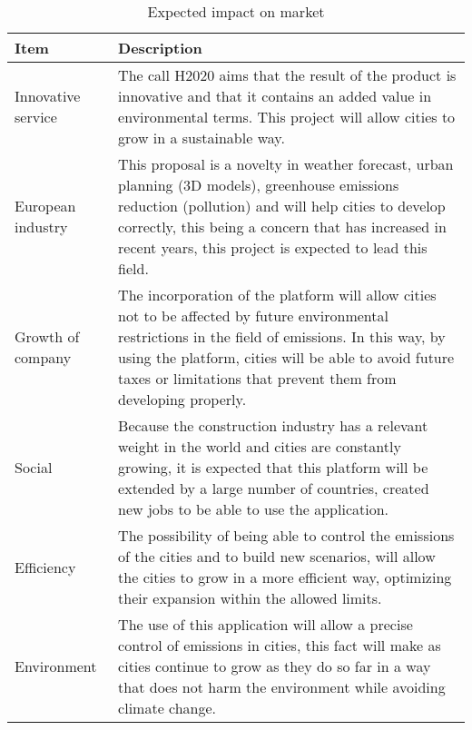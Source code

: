 \begin{table}[H]
	\centering
	\begin{tabular}{l p{11cm}}
		
		\toprule[2pt]
		
		\textbf{Item} &  \textbf{Description}\\
		
		\midrule [1.5pt]
		
		Innovative service & The call H2020 aims that the result of the product is innovative and that it contains an added value in environmental terms. This project will allow cities to grow in a sustainable way.\vspace{0.2cm}\\
		
		\midrule
		
		European industry & This proposal is a novelty in weather forecast, urban planning (3D models), greenhouse emissions reduction (pollution) and will help cities to develop correctly, this being a concern that has increased in recent years, this project is expected to lead this field.\vspace{0.2cm}\\
		
		\midrule
		
		Growth of company & The incorporation of the platform will allow cities not to be affected by future environmental restrictions in the field of emissions. In this way, by using the platform, cities will be able to avoid future taxes or limitations that prevent them from developing properly.\vspace{0.2cm}\\
		
		\midrule
		
		Social & Because the construction industry has a relevant weight in the world and cities are constantly growing, it is expected that this platform will be extended by a large number of countries, created new jobs to be able to use the application.\vspace{0.2cm}\\
		
		\midrule
		
		Efficiency & The possibility of being able to control the emissions of the cities and to build new scenarios, will allow the cities to grow in a more efficient way, optimizing their expansion within the allowed limits.\vspace{0.2cm}\\
		
		\midrule
		
		Environment & The use of this application will allow a precise control of emissions in cities, this fact will make as cities continue to grow as they do so far in a way that does not harm the environment while avoiding climate change.\vspace{0.2cm}\\
		
		\bottomrule[2pt]
		
	\end{tabular}
	\caption{Expected impact on market}
\end{table}

